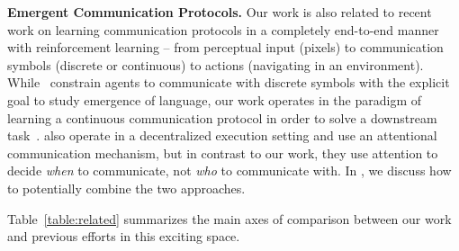 \textbf{Emergent Communication Protocols.} Our work is also related to recent work on learning communication
protocols in a completely end-to-end manner with reinforcement learning -- from perceptual input (\eg pixels)
to communication symbols (discrete or continuous) to actions (\eg navigating in an environment).
While~\citep{foerster_nips16,jorge_iclrw16,visdial_rl,kottur_emnlp17,mordatch_arxiv17,lazaridou_iclr17}
constrain agents to communicate with discrete symbols with the explicit goal to study emergence of language,
our work operates in the paradigm of learning a continuous communication protocol in order to solve a downstream
task~\citep{sukhbaatar_nips16,hoshen_nips17,jiang_nips18,singh_iclr19}.
\citet{jiang_nips18,singh_iclr19} also operate in a decentralized execution
setting and use an attentional communication mechanism, but in contrast to our work,
they use attention to decide \emph{when} to communicate, not \emph{who} to communicate with.
In , we discuss how to potentially combine the two approaches.

Table~\ref{table:related} summarizes
the main axes of comparison between our work and previous efforts in this exciting space.

